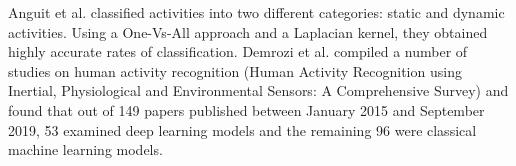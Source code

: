Anguit et al. \cite{Anguita2012}  classified activities into two different categories:  static and dynamic activities. Using a One-Vs-All approach
and a Laplacian kernel, they obtained highly accurate rates of classification.
Demrozi et al. \cite{Demrozi2020} compiled a number of studies on human activity recognition (Human Activity Recognition using Inertial, Physiological and Environmental Sensors: A Comprehensive Survey) and found that out of 149 papers published between January 2015 and September 2019, 53 examined deep learning models and the remaining 96 were classical machine learning models.
